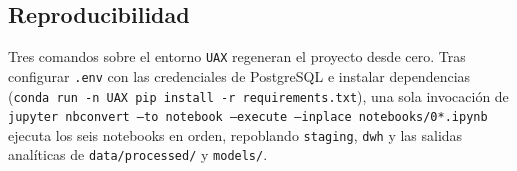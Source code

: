 \subsection*{Reproducibilidad}

Tres comandos sobre el entorno \texttt{UAX} regeneran el proyecto desde
cero. Tras configurar \texttt{.env} con las credenciales de PostgreSQL e
instalar dependencias (\texttt{conda run -n UAX pip install -r
requirements.txt}), una sola invocación de
\texttt{jupyter nbconvert --to notebook --execute --inplace
notebooks/0*.ipynb} ejecuta los seis notebooks en orden, repoblando
\texttt{staging}, \texttt{dwh} y las salidas analíticas de
\texttt{data/processed/} y \texttt{models/}.

